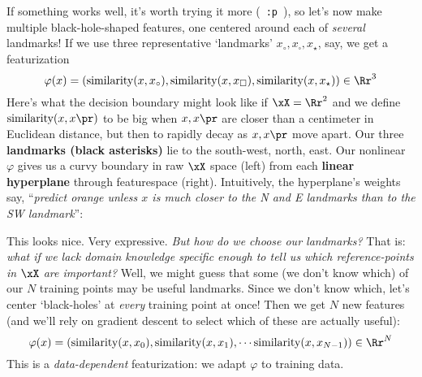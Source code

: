   If something works well, it's worth trying it more (~\texttt{:p}~), so let's
  now make multiple black-hole-shaped features, one centered around each of
  \emph{several} landmarks!
  If we use
  three representative `landmarks' $x_\circ, x_\square, x_\star$, say, we get a
  featurization
  $$
    \varphi(x) =
              (\text{similarity}(x, x_\circ),
               \text{similarity}(x, x_\square),
               \text{similarity}(x, x_\star))
    \in \Rr^3
  $$
  Here's what the decision boundary might look like if $\xX=\Rr^2$ and we
  define $\text{similarity}(x,x\pr)$ to be big when $x,x\pr$ are closer than a
  centimeter in Euclidean distance, but then to rapidly decay as $x,x\pr$ move
  apart.  Our three \textbf{landmarks (black asterisks)} lie to the south-west,
  north, east.  Our nonlinear $\varphi$ gives us a curvy boundary in raw $\xX$
  space (left) from each \textbf{\gre linear hyperplane} through featurespace
  (right).  Intuitively, the hyperplane's weights say, ``\emph{predict {\rng
  orange} unless $x$ is much closer to the N and E landmarks than to the SW
  landmark}'':
  \begin{figure}[h]
    \centering%
    \vspace{-.5cm}%
  \end{figure}
    \vspace{-.25cm}%

  This looks nice.  Very expressive.
  \emph{But how do we choose our
  landmarks?} That is: \emph{what if we lack domain knowledge specific enough
  to tell us which reference-points in $\xX$ are important?}
  Well, we might guess that some (we don't know which) of our $N$ training
  points may be useful landmarks.  Since we don't know which, let's center
  `black-holes' at \emph{every} training point at once!  Then we get $N$ new
  features (and we'll rely on gradient descent to select which of these are
  actually useful):
  $$
    \varphi(x) =
              (\text{similarity}(x, x_0),
               \text{similarity}(x, x_1),
                \cdots
               \text{similarity}(x, x_{N-1}))
    \in \Rr^N
  $$
  This is a \emph{data-dependent} featurization: we adapt $\varphi$ to
  training data.

